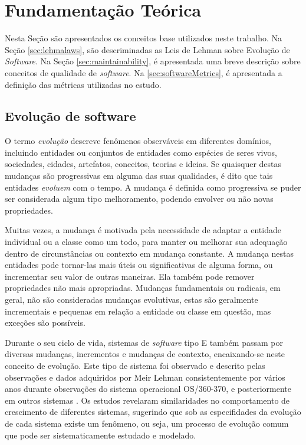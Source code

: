 \chapter{Fundamentação Teórica}
\label{chapter:fundamentos}

Nesta Seção são apresentados os conceitos base utilizados neste trabalho. Na Seção \ref{sec:lehmalaws}, são descriminadas as Leis de Lehman sobre Evolução de \textit{Software}. Na Seção \ref{sec:maintainability}, é apresentada uma breve descrição sobre conceitos de qualidade de \textit{software}. Na \ref{sec:softwareMetrics}, é apresentada a definição das métricas utilizadas no estudo.
\section{Evolução de software}
O termo \textit{evolução} descreve fenômenos observáveis em diferentes domínios, incluindo entidades ou conjuntos de entidades como espécies de seres vivos, sociedades, cidades, artefatos, conceitos, teorias e ideias. Se quaisquer destas mudanças são progressivas em alguma das suas qualidades, é dito que tais entidades \textit{evoluem} com o tempo. A mudança é definida como progressiva se puder ser considerada algum tipo melhoramento, podendo envolver ou não novas propriedades\cite{lehman1996laws}.

Muitas vezes, a mudança é motivada pela necessidade de adaptar a entidade individual ou a classe como um todo, para manter ou melhorar sua adequação dentro de circunstâncias ou contexto em mudança constante. A mudança nestas entidades pode tornar-las mais úteis ou significativas de alguma forma, ou incrementar seu valor de outras maneiras. Ela também pode remover propriedades não mais apropriadas. Mudanças fundamentais ou radicais, em geral, não são consideradas mudanças evolutivas, estas são geralmente incrementais e pequenas em relação a entidade ou classe em questão, mas exceções são possíveis.

Durante o seu ciclo de vida, sistemas de \textit{software} tipo E também passam por diversas mudanças, incrementos e mudanças de contexto, encaixando-se neste conceito de evolução. Este tipo de sistema foi observado e descrito pelas observações e dados adquiridos por Meir Lehman consistentemente por vários anos durante observações do sistema operacional OS/360-370, e posteriormente em outros sistemas \cite{lehman1979understanding,lehman1980programs,lehman1985program}. Os estudos revelaram similaridades no comportamento de crescimento de diferentes sistemas, sugerindo que sob as especifidades da evolução de cada sistema existe um fenômeno, ou seja, um processo de evolução comum que pode ser sistematicamente estudado e modelado. 

